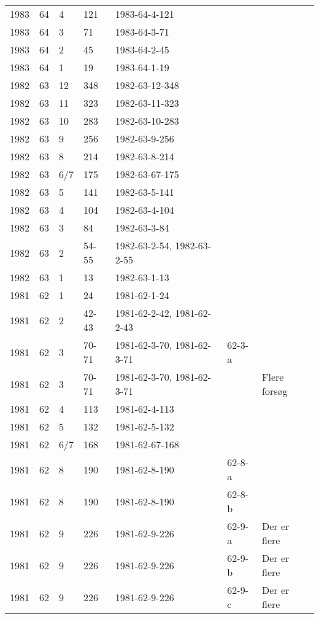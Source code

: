 \begin{longtable}{ |l|l|l|l|p{2.7cm}|l|p{2cm}| }
 1983 & 64 &     4 &    121  & 1983-64-4-121  &  & \\
 1983 & 64 &     3 &     71  & 1983-64-3-71   &  & \\
 1983 & 64 &     2 &    45   & 1983-64-2-45   &  & \\
 1983 & 64 &     1 &    19   & 1983-64-1-19   &  & \\
 1982 & 63 &    12 &   348   & 1982-63-12-348 &  & \\
 1982 & 63 &    11 &   323   & 1982-63-11-323 &  & \\
 1982 & 63 &    10 &   283   & 1982-63-10-283 &  & \\
 1982 & 63 &     9 &   256   & 1982-63-9-256  &  & \\
 1982 & 63 &     8 &   214   & 1982-63-8-214  &  & \\
 1982 & 63 &   6/7 &   175   & 1982-63-67-175 &  & \\
 1982 & 63 &     5 &   141   & 1982-63-5-141  &  & \\
 1982 & 63 &     4 &   104   & 1982-63-4-104  &  & \\
 1982 & 63 &     3 &   84    & 1982-63-3-84   &  & \\
 1982 & 63 &     2 &  54-55  & 1982-63-2-54, 1982-63-2-55  &  & \\
 1982 & 63 &     1 &   13    & 1982-63-1-13   &  & \\
 1981 & 62 &     1 &      24 &   1981-62-1-24 &  & \\
 1981 & 62 &     2 &   42-43 & 1981-62-2-42, 1981-62-2-43 &  & \\
 1981 & 62 &     3 &   70-71 & 1981-62-3-70, 1981-62-3-71 & 62-3-a & \\
 1981 & 62 &   3 &   70-71 & 1981-62-3-70, 1981-62-3-71 &  & Flere forsøg \\
 1981 & 62 &     4 &     113 &  1981-62-4-113 &  & \\
 1981 & 62 &     5 &     132 &  1981-62-5-132 &  & \\
 1981 & 62 &   6/7 &     168 & 1981-62-67-168 &  & \\
 1981 & 62 &     8 &     190 &  1981-62-8-190 & 62-8-a & \\
 1981 & 62 &     8 &     190 &  1981-62-8-190 & 62-8-b & \\
 1981 & 62 &     9 &     226 &  1981-62-9-226 &  62-9-a & Der er flere \\
 1981 & 62 &     9 &     226 &  1981-62-9-226 &  62-9-b & Der er flere \\
 1981 & 62 &     9 &     226 &  1981-62-9-226 &  62-9-c & Der er flere \\

\end{longtable}
